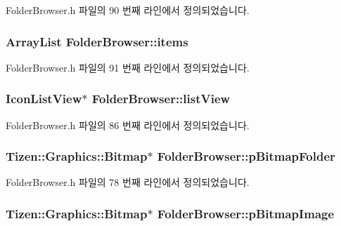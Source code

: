 Folder\+Browser.\+h 파일의 90 번째 라인에서 정의되었습니다.

\hypertarget{class_folder_browser_ae88620740bd179b78a573f1db28c50ba}{
\subsubsection[{items}]{\setlength{\rightskip}{0pt plus 5cm}Array\+List Folder\+Browser\+::items\hspace{0.3cm}{\ttfamily [private]}}}\label{class_folder_browser_ae88620740bd179b78a573f1db28c50ba}


Folder\+Browser.\+h 파일의 91 번째 라인에서 정의되었습니다.

\hypertarget{class_folder_browser_aee2bb8ad9f494b0ada8ee359a2e34555}{
\subsubsection[{list\+View}]{\setlength{\rightskip}{0pt plus 5cm}Icon\+List\+View$\ast$ Folder\+Browser\+::list\+View\hspace{0.3cm}{\ttfamily [private]}}}\label{class_folder_browser_aee2bb8ad9f494b0ada8ee359a2e34555}


Folder\+Browser.\+h 파일의 86 번째 라인에서 정의되었습니다.

\hypertarget{class_folder_browser_a59c025c6956a8a9ef74395d12261a36e}{
\subsubsection[{p\+Bitmap\+Folder}]{\setlength{\rightskip}{0pt plus 5cm}Tizen\+::\+Graphics\+::\+Bitmap$\ast$ Folder\+Browser\+::p\+Bitmap\+Folder\hspace{0.3cm}{\ttfamily [private]}}}\label{class_folder_browser_a59c025c6956a8a9ef74395d12261a36e}


Folder\+Browser.\+h 파일의 78 번째 라인에서 정의되었습니다.

\hypertarget{class_folder_browser_a4d40caed1664eca59bbf9e3da1cde15c}{
\subsubsection[{p\+Bitmap\+Image}]{\setlength{\rightskip}{0pt plus 5cm}Tizen\+::\+Graphics\+::\+Bitmap$\ast$ Folder\+Browser\+::p\+Bitmap\+Image\hspace{0.3cm}{\ttfamily [private]}}}\label{class_folder_browser_a4d40caed1664eca59bbf9e3da1cde15c}


